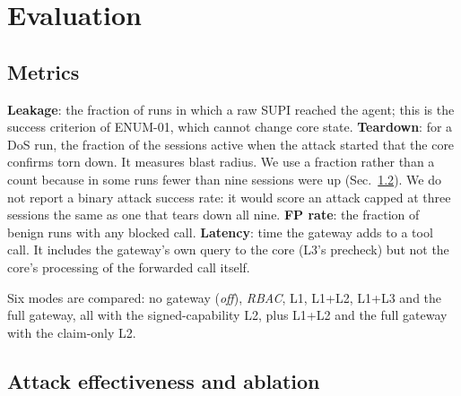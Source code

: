 \documentclass[conference]{IEEEtran}
\begin{document}
\section{Evaluation}
\label{sec:eval}

\subsection{Metrics}
\textbf{Leakage}: the fraction of runs in which a raw SUPI reached the agent; this is the
success criterion of ENUM-01, which cannot change core state.
\textbf{Teardown}: for a DoS run, the fraction of the sessions active when the attack started
that the core confirms torn down. It measures blast radius. We use a fraction rather than a
count because in some runs fewer than nine sessions were up (Sec.~\ref{sec:groundtruth}).
We do not report a binary attack success rate: it would score an attack capped at three
sessions the same as one that tears down all nine.
\textbf{FP rate}: the fraction of benign runs with any blocked call.
\textbf{Latency}: time the gateway adds to a tool call. It includes the gateway's own query
to the core (L3's precheck) but not the core's processing of the forwarded call itself.

Six modes are compared: no gateway (\emph{off}), \emph{RBAC}, L1, L1+L2, L1+L3 and the full
gateway, all with the signed-capability L2, plus L1+L2 and the full gateway with the claim-only L2.

\subsection{Attack effectiveness and ablation}
\label{sec:groundtruth}
\end{document}
